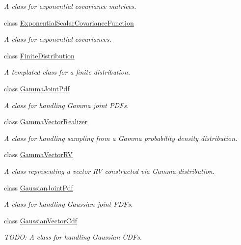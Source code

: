 \begin{DoxyCompactItemize}
\begin{DoxyCompactList}\small\item\em A class for exponential covariance matrices. \end{DoxyCompactList}\item 
class \hyperlink{class_q_u_e_s_o_1_1_exponential_scalar_covariance_function}{Exponential\-Scalar\-Covariance\-Function}
\begin{DoxyCompactList}\small\item\em A class for exponential covariances. \end{DoxyCompactList}\item 
class \hyperlink{class_q_u_e_s_o_1_1_finite_distribution}{Finite\-Distribution}
\begin{DoxyCompactList}\small\item\em A templated class for a finite distribution. \end{DoxyCompactList}\item 
class \hyperlink{class_q_u_e_s_o_1_1_gamma_joint_pdf}{Gamma\-Joint\-Pdf}
\begin{DoxyCompactList}\small\item\em A class for handling Gamma joint P\-D\-Fs. \end{DoxyCompactList}\item 
class \hyperlink{class_q_u_e_s_o_1_1_gamma_vector_realizer}{Gamma\-Vector\-Realizer}
\begin{DoxyCompactList}\small\item\em A class for handling sampling from a Gamma probability density distribution. \end{DoxyCompactList}\item 
class \hyperlink{class_q_u_e_s_o_1_1_gamma_vector_r_v}{Gamma\-Vector\-R\-V}
\begin{DoxyCompactList}\small\item\em A class representing a vector R\-V constructed via Gamma distribution. \end{DoxyCompactList}\item 
class \hyperlink{class_q_u_e_s_o_1_1_gaussian_joint_pdf}{Gaussian\-Joint\-Pdf}
\begin{DoxyCompactList}\small\item\em A class for handling Gaussian joint P\-D\-Fs. \end{DoxyCompactList}\item 
class \hyperlink{class_q_u_e_s_o_1_1_gaussian_vector_cdf}{Gaussian\-Vector\-Cdf}
\begin{DoxyCompactList}\small\item\em T\-O\-D\-O\-: A class for handling Gaussian C\-D\-Fs. \end{DoxyCompactList}\item 

\end{DoxyCompactItemize}
